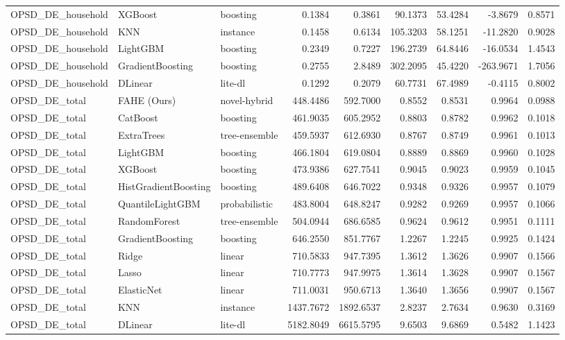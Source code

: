 \begin{tabular}{lllrrrrrr}
OPSD_DE_household & XGBoost & boosting & 0.1384 & 0.3861 & 90.1373 & 53.4284 & -3.8679 & 0.8571 \\
OPSD_DE_household & KNN & instance & 0.1458 & 0.6134 & 105.3203 & 58.1251 & -11.2820 & 0.9028 \\
OPSD_DE_household & LightGBM & boosting & 0.2349 & 0.7227 & 196.2739 & 64.8446 & -16.0534 & 1.4543 \\
OPSD_DE_household & GradientBoosting & boosting & 0.2755 & 2.8489 & 302.2095 & 45.4220 & -263.9671 & 1.7056 \\
OPSD_DE_household & DLinear & lite-dl & 0.1292 & 0.2079 & 60.7731 & 67.4989 & -0.4115 & 0.8002 \\
OPSD_DE_total & FAHE (Ours) & novel-hybrid & 448.4486 & 592.7000 & 0.8552 & 0.8531 & 0.9964 & 0.0988 \\
OPSD_DE_total & CatBoost & boosting & 461.9035 & 605.2952 & 0.8803 & 0.8782 & 0.9962 & 0.1018 \\
OPSD_DE_total & ExtraTrees & tree-ensemble & 459.5937 & 612.6930 & 0.8767 & 0.8749 & 0.9961 & 0.1013 \\
OPSD_DE_total & LightGBM & boosting & 466.1804 & 619.0804 & 0.8889 & 0.8869 & 0.9960 & 0.1028 \\
OPSD_DE_total & XGBoost & boosting & 473.9386 & 627.7541 & 0.9045 & 0.9023 & 0.9959 & 0.1045 \\
OPSD_DE_total & HistGradientBoosting & boosting & 489.6408 & 646.7022 & 0.9348 & 0.9326 & 0.9957 & 0.1079 \\
OPSD_DE_total & QuantileLightGBM & probabilistic & 483.8004 & 648.8247 & 0.9282 & 0.9269 & 0.9957 & 0.1066 \\
OPSD_DE_total & RandomForest & tree-ensemble & 504.0944 & 686.6585 & 0.9624 & 0.9612 & 0.9951 & 0.1111 \\
OPSD_DE_total & GradientBoosting & boosting & 646.2550 & 851.7767 & 1.2267 & 1.2245 & 0.9925 & 0.1424 \\
OPSD_DE_total & Ridge & linear & 710.5833 & 947.7395 & 1.3612 & 1.3626 & 0.9907 & 0.1566 \\
OPSD_DE_total & Lasso & linear & 710.7773 & 947.9975 & 1.3614 & 1.3628 & 0.9907 & 0.1567 \\
OPSD_DE_total & ElasticNet & linear & 711.0031 & 950.6713 & 1.3640 & 1.3656 & 0.9907 & 0.1567 \\
OPSD_DE_total & KNN & instance & 1437.7672 & 1892.6537 & 2.8237 & 2.7634 & 0.9630 & 0.3169 \\
OPSD_DE_total & DLinear & lite-dl & 5182.8049 & 6615.5795 & 9.6503 & 9.6869 & 0.5482 & 1.1423 \\

\end{tabular}
